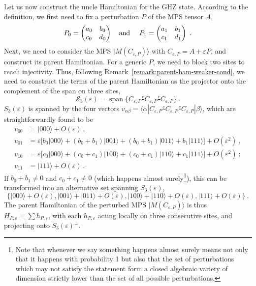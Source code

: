 \documentclass[cmp]{svjour}
\newcommand{\mc}[1]{\mathcal{#1}}
\newcommand{\veps}{\varepsilon}
\DeclareMathOperator{\spann}{span}
\newcommand{\bra}[1]{\langle #1|}
\newcommand{\ket}[1]{|#1\rangle}
\def\cont{\tfrac{c}{\ \ }}
\begin{document}
Let us now construct the uncle Hamiltonian for the GHZ state. According to
the definition, we first need to fix a perturbation $P$ of the MPS tensor
$A$,
\begin{equation}
    \label{eq:P-GHZ}
    P_0=\left( \begin{matrix}
            a_0 & b_0 \\ c_0 & d_0 \end{matrix} \right)\mbox{\quad and \quad}
    P_1=\left( \begin{matrix}
            a_1 & b_1 \\ c_1 & d_1 \end{matrix} \right)\ .
\end{equation}
Next, we need to consider the MPS $\ket{M(C_{\varepsilon,P})}$ with
$C_{\varepsilon,P}=A+\varepsilon P$, and construct its parent Hamiltonian.
For a generic $P$, we need to block two sites to reach injectivity.
Thus, following Remark~\ref{remark:parent-ham-weaker-cond}, we need to
construct the terms of the parent Hamiltonian as the projector onto the
complement of the span on three sites,
\[
    \mc S_3(\varepsilon)=\spann\{C_{\varepsilon,P}\cont C_{\varepsilon,P}\cont
    C_{\varepsilon,P}\}\ .
\]
$S_3(\varepsilon)$ is spanned by the four vectors $v_{\alpha\beta}=
    \bra\alpha C_{\varepsilon,P}\cont C_{\varepsilon,P}\cont
    C_{\varepsilon,P}\ket\beta$, which are straightforwardly found to be
\begin{align*}
    v_{00} & =\ket{000}+O(\varepsilon)\ ,                            \\
    v_{01} & = \varepsilon\big[b_0 \ket{000} +(b_0+b_1)  \ket{001} +
    (b_0+b_1) \ket{011}+ b_1\ket{111}\big]+O(\varepsilon^2)\ ,       \\
    v_{10} & = \varepsilon\big[c_0 \ket{000} +(c_0+c_1)  \ket{100} +
    (c_0+c_1) \ket{110}+ c_1\ket{111}\big]+O(\varepsilon^2)\ ;       \\
    v_{11} & =  \ket{111}+O(\varepsilon)\ .
\end{align*}
If $b_0+b_1\ne0$ and $c_0+c_1\ne0$ (which happens almost
surely\footnote{Note that whenever we say something happens almost surely
    means not only that it happens with probability 1 but also that the set of
    perturbations which may not satisfy the statement form a closed algebraic
    variety of dimension strictly lower than the set of all possible
    perturbations.}), this can be transformed into an alternative set
spanning $S_3(\veps)$,
\begin{equation}
    \label{eq:ghz-parent-set}
    \big\{\ket{000} + O(\varepsilon),\ket{001} + \ket{011}+O(\varepsilon),
    \ket{100} +  \ket{110} + O(\varepsilon),\ket{111}+O(\varepsilon)\big\}\ .
\end{equation}
The parent Hamiltonian of the perturbed MPS $\ket{M(C_{\varepsilon,P})}$ is
thus
$H_{P,\varepsilon}=\sum h_{P,\varepsilon}$, with each $h_{P,\veps}$ acting
locally on three consecutive sites, and projecting onto $S_3(\veps)^\perp$.
\end{document}
